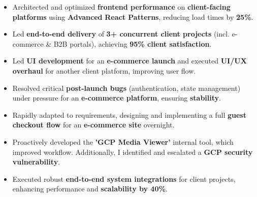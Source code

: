 \documentclass[10pt,a4paper,ragged2e]{altacv}
\begin{document}
\begin{itemize}
\item Architected and optimized \textbf{frontend performance} on \textbf{client-facing platforms} using \textbf{Advanced} \textbf{React Patterns}, reducing load times by \textbf{25\%}.
\item Led \textbf{end-to-end delivery} of \textbf{3+ concurrent client projects} (incl. e-commerce \& B2B portals), achieving \textbf{95\% client satisfaction}.
\item Led \textbf{UI development} for an \textbf{e-commerce launch} and executed \textbf{UI/UX overhaul} for another client platform, improving user flow.
\item Resolved critical \textbf{post-launch bugs} (authentication, state management) under pressure for an \textbf{e-commerce platform}, ensuring \textbf{stability}.
\item Rapidly adapted to requirements, designing and implementing a full \textbf{guest checkout flow} for an \textbf{e-commerce site} overnight.
\item Proactively developed the\textbf{ 'GCP Media Viewer'} internal tool, which improved workflow. Additionally, I identified and escalated a \textbf{GCP security vulnerability}.
\item Executed robust \textbf{end-to-end system integrations} for client projects, enhancing performance and \textbf{scalability by 40\%}.

\end{itemize}

\divider
\end{document}

